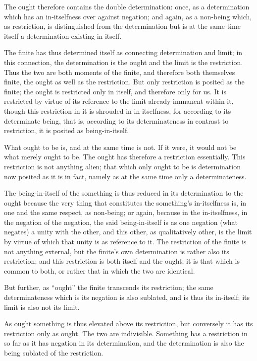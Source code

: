 The ought therefore contains the double determination:
once, as a determination which has
an in-itselfness over against negation;
and again, as a non-being which, as restriction,
is distinguished from the determination
but is at the same time itself
a determination existing in itself.

The finite has thus determined itself
as connecting determination and limit;
in this connection, the determination is the ought
and the limit is the restriction.
Thus the two are both moments of the finite,
and therefore both themselves finite,
the ought as well as the restriction.
But only restriction is posited as the finite;
the ought is restricted only in itself,
and therefore only for us.
It is restricted by virtue of its reference
to the limit already immanent within it,
though this restriction in it is shrouded in in-itselfness,
for according to its determinate being,
that is, according to its determinateness
in contrast to restriction,
it is posited as being-in-itself.

What ought to be is, and at the same time is not.
If it were, it would not be what merely ought to be.
The ought has therefore a restriction essentially.
This restriction is not anything alien;
that which only ought to be is determination
now posited as it is in fact,
namely as at the same time
only a determinateness.

The being-in-itself of the something is
thus reduced in its determination
to the ought because the very thing
that constitutes the something's in-itselfness is,
in one and the same respect, as non-being;
or again, because in the in-itselfness,
in the negation of the negation,
the said being-in-itself is as
one negation (what negates) a unity with the other,
and this other, as qualitatively other, is the limit
by virtue of which that unity is as reference to it.
The restriction of the finite is not anything external,
but the finite's own determination is rather also its restriction;
and this restriction is both itself and the ought;
it is that which is common to both,
or rather that in which the two are identical.

But further, as “ought” the finite transcends its restriction;
the same determinateness which is its negation is also sublated,
and is thus its in-itself;
its limit is also not its limit.

As ought something is thus elevated above its restriction,
but conversely it has its restriction only as ought.
The two are indivisible.
Something has a restriction in so far as
it has negation in its determination,
and the determination is also
the being sublated of the restriction.


